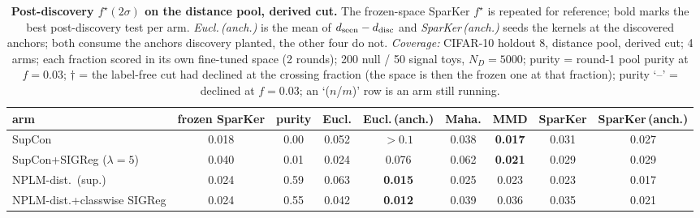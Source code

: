 \begin{table}[t]
\centering
\footnotesize
\begin{tabular}{lcccccccc}
\toprule
arm & frozen SparKer & purity & Eucl. & Eucl.\,(anch.) & Maha. & MMD & SparKer & SparKer\,(anch.) \\
\midrule
SupCon & 0.018 & 0.00 & 0.052 & $>0.1$ & 0.038 & \textbf{0.017} & 0.031 & 0.027 \\
\addlinespace
SupCon+SIGReg ($\lambda{=}5$) & 0.040 & 0.01 & 0.024 & 0.076 & 0.062 & \textbf{0.021} & 0.029 & 0.029 \\
\addlinespace
NPLM-dist.\ (sup.) & 0.024 & 0.59 & 0.063 & \textbf{0.015} & 0.025 & 0.023 & 0.023 & 0.017 \\
\addlinespace
NPLM-dist.+classwise SIGReg & 0.024 & 0.55 & 0.042 & \textbf{0.012} & 0.039 & 0.036 & 0.035 & 0.021 \\
\bottomrule
\end{tabular}
\caption{\textbf{Post-discovery $f^\star(2\sigma)$ on the distance pool, derived cut.} The frozen-space SparKer $f^\star$ is repeated for reference; bold marks the best post-discovery test per arm. \emph{Eucl.\,(anch.)} is the mean of $d_{\rm seen}-d_{\rm disc}$ and \emph{SparKer\,(anch.)} seeds the kernels at the discovered anchors; both consume the anchors discovery planted, the other four do not. \emph{Coverage:} CIFAR-10 holdout 8, distance pool, derived cut; 4 arms; each fraction scored in its own fine-tuned space (2 rounds); 200 null / 50 signal toys, $N_D{=}5000$; purity = round-1 pool purity at $f{=}0.03$; $\dagger$ = the label-free cut had declined at the crossing fraction (the space is then the frozen one at that fraction); purity `--' = declined at $f{=}0.03$; an `($n$/$m$)' row is an arm still running.}
\label{tab:sigma_post_cifar10_h8_legal}
\end{table}
